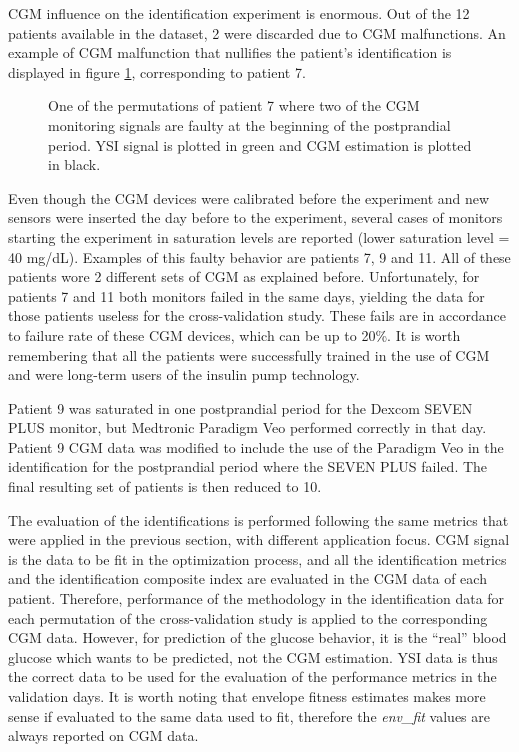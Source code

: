 CGM influence on the identification experiment is enormous. Out of the 12 patients available in the dataset, 2 were discarded due to CGM malfunctions. An example of CGM malfunction that nullifies the patient's identification is displayed in figure \ref{fig:patient7failCGM}, corresponding to patient 7.

\begin{figure}[hbt]
\centering
{}\caption{One of the permutations of patient 7 where two of the CGM monitoring signals are faulty at the beginning of the postprandial period. YSI signal is plotted in green and CGM estimation is plotted in black.}
\label{fig:patient7failCGM}
\end{figure}

Even though the CGM devices were calibrated before the experiment and new sensors were inserted the day before to the experiment, several cases of monitors starting the experiment in saturation levels are reported (lower saturation level = 40 mg/dL). Examples of this faulty behavior are patients 7, 9 and 11. All of these patients wore 2 different sets of CGM as explained before. Unfortunately, for patients 7 and 11 both monitors failed in the same days, yielding the data for those patients useless for the cross-validation study. These fails are in accordance to failure rate of these CGM devices, which can be up to 20\%. It is worth remembering that all the patients were successfully trained in the use of CGM and were long-term users of the insulin pump technology.

Patient 9 was saturated in one postprandial period for the Dexcom\textsuperscript{\textregistered} SEVEN\textsuperscript{\textregistered} PLUS monitor, but Medtronic\textsuperscript{\textregistered} Paradigm\textsuperscript{\textregistered} Veo\texttrademark{} performed correctly in that day. Patient 9 CGM data was modified to include the use of the Paradigm\textsuperscript{\textregistered} Veo\texttrademark{} in the identification for the postprandial period where the SEVEN\textsuperscript{\textregistered} PLUS failed. The final resulting set of patients is then reduced to 10.

The evaluation of the identifications is performed following the same metrics that were applied in the previous section, with different application focus. CGM signal is the data to be fit in the optimization process, and all the identification metrics and the identification composite index are evaluated in the CGM data of each patient. Therefore, performance of the methodology in the identification data for each permutation of the cross-validation study is applied to the corresponding CGM data. However, for prediction of the glucose behavior, it is the ``real'' blood glucose which wants to be predicted, not the CGM estimation. YSI data is thus the correct data to be used for the evaluation of the performance metrics in the validation days. It is worth noting that envelope fitness estimates makes more sense if evaluated to the same data used to fit, therefore the \textit{env\_fit} values are always reported on CGM data.

